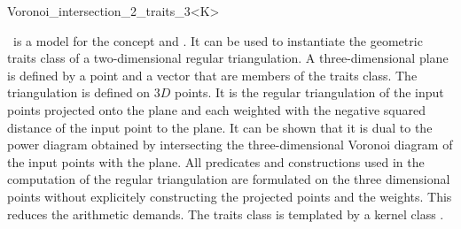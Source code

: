 

\begin{ccRefClass}{Voronoi_intersection_2_traits_3<K>}
  



  \ccDefinition \ccRefName\ is a model for the concept
   and
  .  It can be used to instantiate the
  geometric traits class of a two-dimensional regular triangulation.
  A three-dimensional plane is defined by a point and a vector that
  are members of the traits class. The triangulation is defined on $3D$
  points. It is the regular triangulation of the input points
  projected onto the plane and each weighted with the negative squared
  distance of the input point to the plane. It can be shown that it is
  dual to the power diagram obtained by intersecting the
  three-dimensional Voronoi diagram of the input points with the
  plane. All predicates and constructions used in the computation of
  the regular triangulation are formulated on the three dimensional
  points without explicitely constructing the projected points and the
  weights. This reduces the arithmetic demands. The traits class is
  templated by a kernel class .
  

  \ccIsModel 
   \\
  

\end{ccRefClass}
